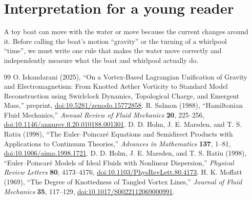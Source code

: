 \documentclass[11pt,a4paper]{article}
\begin{document}
\section*{Interpretation for a young reader}
A toy boat can move with the water or move because the current changes around it. Before calling the boat's motion ``gravity'' or the turning of a whirlpool ``time'', we must write one rule that makes the water move correctly and independently measure what the boat and whirlpool actually do.

\begin{thebibliography}{99}
 O. Iskandarani (2025), ``On a Vortex-Based Lagrangian Unification of Gravity and Electromagnetism: From Knotted Aether Vorticity to Standard Model Reconstruction using Swirlclock Dynamics, Topological Charge, and Emergent Mass,'' preprint, \href{https://doi.org/10.5281/zenodo.15772858}{doi:10.5281/zenodo.15772858}.
 R. Salmon (1988), ``Hamiltonian Fluid Mechanics,'' \emph{Annual Review of Fluid Mechanics} \textbf{20}, 225--256, \href{https://doi.org/10.1146/annurev.fl.20.010188.001301}{doi:10.1146/annurev.fl.20.010188.001301}.
 D. D. Holm, J. E. Marsden, and T. S. Ratiu (1998), ``The Euler--Poincar\'e Equations and Semidirect Products with Applications to Continuum Theories,'' \emph{Advances in Mathematics} \textbf{137}, 1--81, \href{https://doi.org/10.1006/aima.1998.1721}{doi:10.1006/aima.1998.1721}.
 D. D. Holm, J. E. Marsden, and T. S. Ratiu (1998), ``Euler--Poincar\'e Models of Ideal Fluids with Nonlinear Dispersion,'' \emph{Physical Review Letters} \textbf{80}, 4173--4176, \href{https://doi.org/10.1103/PhysRevLett.80.4173}{doi:10.1103/PhysRevLett.80.4173}.
 H. K. Moffatt (1969), ``The Degree of Knottedness of Tangled Vortex Lines,'' \emph{Journal of Fluid Mechanics} \textbf{35}, 117--129, \href{https://doi.org/10.1017/S0022112069000991}{doi:10.1017/S0022112069000991}.
\end{thebibliography}
\end{document}
